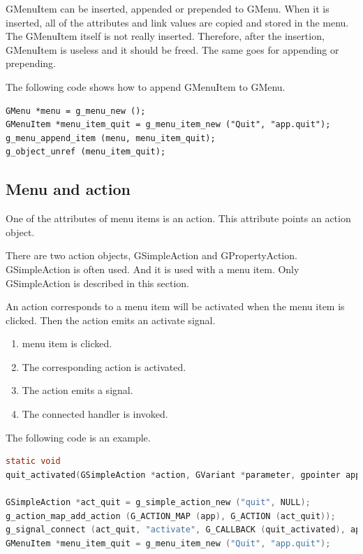 GMenuItem can be inserted, appended or prepended to GMenu. When it is
inserted, all of the attributes and link values are copied and stored in
the menu. The GMenuItem itself is not really inserted. Therefore, after
the insertion, GMenuItem is useless and it should be freed. The same
goes for appending or prepending.

The following code shows how to append GMenuItem to GMenu.

\begin{lstlisting}
GMenu *menu = g_menu_new ();
GMenuItem *menu_item_quit = g_menu_item_new ("Quit", "app.quit");
g_menu_append_item (menu, menu_item_quit);
g_object_unref (menu_item_quit);
\end{lstlisting}

\subsection{Menu and action}\label{menu-and-action}

One of the attributes of menu items is an action. This attribute points
an action object.

There are two action objects, GSimpleAction and GPropertyAction.
GSimpleAction is often used. And it is used with a menu item. Only
GSimpleAction is described in this section.

An action corresponds to a menu item will be activated when the menu
item is clicked. Then the action emits an activate signal.

\begin{enumerate}
\def\labelenumi{\arabic{enumi}.}
\tightlist
\item
  menu item is clicked.
\item
  The corresponding action is activated.
\item
  The action emits a signal.
\item
  The connected handler is invoked.
\end{enumerate}

The following code is an example.

\begin{lstlisting}[language=C]
static void
quit_activated(GSimpleAction *action, GVariant *parameter, gpointer app) { ... ... ...}

GSimpleAction *act_quit = g_simple_action_new ("quit", NULL);
g_action_map_add_action (G_ACTION_MAP (app), G_ACTION (act_quit));
g_signal_connect (act_quit, "activate", G_CALLBACK (quit_activated), app);
GMenuItem *menu_item_quit = g_menu_item_new ("Quit", "app.quit");
\end{lstlisting}

